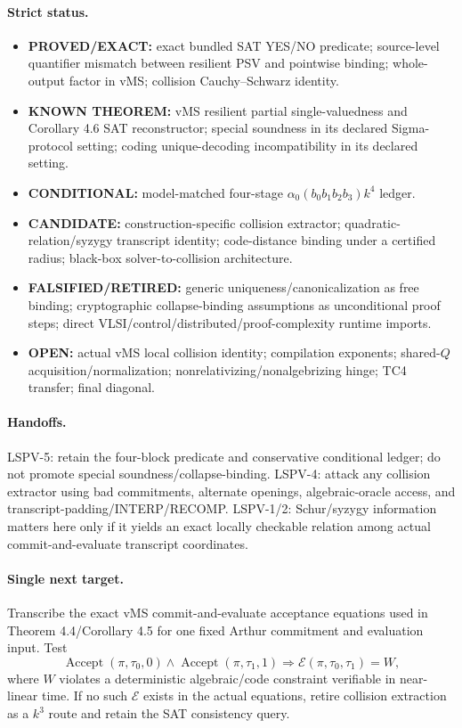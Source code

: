 \documentclass[11pt]{article}
\begin{document}
\paragraph{Strict status.}
\begin{itemize}
\item[] \textbf{PROVED/EXACT:} exact bundled SAT YES/NO predicate; source-level quantifier mismatch between resilient PSV and pointwise binding; whole-output factor in vMS; collision Cauchy--Schwarz identity.
\item[] \textbf{KNOWN THEOREM:} vMS resilient partial single-valuedness and Corollary 4.6 SAT reconstructor; special soundness in its declared Sigma-protocol setting; coding unique-decoding incompatibility in its declared setting.
\item[] \textbf{CONDITIONAL:} model-matched four-stage $\alpha_0(b_0b_1b_2b_3)k^4$ ledger.
\item[] \textbf{CANDIDATE:} construction-specific collision extractor; quadratic-relation/syzygy transcript identity; code-distance binding under a certified radius; black-box solver-to-collision architecture.
\item[] \textbf{FALSIFIED/RETIRED:} generic uniqueness/canonicalization as free binding; cryptographic collapse-binding assumptions as unconditional proof steps; direct VLSI/control/distributed/proof-complexity runtime imports.
\item[] \textbf{OPEN:} actual vMS local collision identity; compilation exponents; shared-$Q$ acquisition/normalization; nonrelativizing/nonalgebrizing hinge; TC4 transfer; final diagonal.
\end{itemize}

\paragraph{Handoffs.}
LSPV-5: retain the four-block predicate and conservative conditional ledger; do not promote special soundness/collapse-binding. LSPV-4: attack any collision extractor using bad commitments, alternate openings, algebraic-oracle access, and transcript-padding/INTERP/RECOMP. LSPV-1/2: Schur/syzygy information matters here only if it yields an exact locally checkable relation among actual commit-and-evaluate transcript coordinates.

\paragraph{Single next target.}
Transcribe the exact vMS commit-and-evaluate acceptance equations used in Theorem 4.4/Corollary 4.5 for one fixed Arthur commitment and evaluation input. Test
\[
\operatorname{Accept}(\pi,\tau_0,0)\wedge\operatorname{Accept}(\pi,\tau_1,1)
\Longrightarrow\mathcal E(\pi,\tau_0,\tau_1)=W,
\]
where $W$ violates a deterministic algebraic/code constraint verifiable in near-linear time. If no such $\mathcal E$ exists in the actual equations, retire collision extraction as a $k^3$ route and retain the SAT consistency query.
\end{document}
